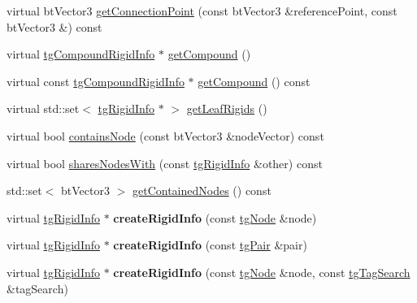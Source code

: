 \begin{DoxyCompactItemize}
\item 
virtual bt\-Vector3 \hyperlink{classtg_compound_rigid_info_a68d3a9c0aba249e83afc987157d92205}{get\-Connection\-Point} (const bt\-Vector3 \&reference\-Point, const bt\-Vector3 \&) const 
\item 
virtual \hyperlink{classtg_compound_rigid_info}{tg\-Compound\-Rigid\-Info} $\ast$ \hyperlink{classtg_compound_rigid_info_aa3efabdcaaa73b20e8f54f0a9078e7c8}{get\-Compound} ()
\item 
virtual const \hyperlink{classtg_compound_rigid_info}{tg\-Compound\-Rigid\-Info} $\ast$ \hyperlink{classtg_compound_rigid_info_a7fd1daa19aaaf18b8bc4a6515ad3fe49}{get\-Compound} () const 
\item 
virtual std\-::set$<$ \hyperlink{classtg_rigid_info}{tg\-Rigid\-Info} $\ast$ $>$ \hyperlink{classtg_compound_rigid_info_a253b7389913caff94baa2a34150d1171}{get\-Leaf\-Rigids} ()
\item 
virtual bool \hyperlink{classtg_compound_rigid_info_a3c82d68ac0347f3a584c2628fdb825cc}{contains\-Node} (const bt\-Vector3 \&node\-Vector) const 
\item 
virtual bool \hyperlink{classtg_compound_rigid_info_a372bf800b5f126b5347acb109b3bba53}{shares\-Nodes\-With} (const \hyperlink{classtg_rigid_info}{tg\-Rigid\-Info} \&other) const 
\item 
std\-::set$<$ bt\-Vector3 $>$ \hyperlink{classtg_compound_rigid_info_ae2cd4e778a173251232f257467a84a17}{get\-Contained\-Nodes} () const 
\item 
\hypertarget{classtg_rigid_info_a5d2a96b8148b75b8bb71640c74e355cb}{virtual \hyperlink{classtg_rigid_info}{tg\-Rigid\-Info} $\ast$ {\bfseries create\-Rigid\-Info} (const \hyperlink{classtg_node}{tg\-Node} \&node)}\label{classtg_rigid_info_a5d2a96b8148b75b8bb71640c74e355cb}

\item 
\hypertarget{classtg_rigid_info_ab49822de5b103feac5e08465618873de}{virtual \hyperlink{classtg_rigid_info}{tg\-Rigid\-Info} $\ast$ {\bfseries create\-Rigid\-Info} (const \hyperlink{classtg_pair}{tg\-Pair} \&pair)}\label{classtg_rigid_info_ab49822de5b103feac5e08465618873de}

\item 
\hypertarget{classtg_rigid_info_a06b02534af62fa7c935accf8321a4c8f}{virtual \hyperlink{classtg_rigid_info}{tg\-Rigid\-Info} $\ast$ {\bfseries create\-Rigid\-Info} (const \hyperlink{classtg_node}{tg\-Node} \&node, const \hyperlink{classtg_tag_search}{tg\-Tag\-Search} \&tag\-Search)}\label{classtg_rigid_info_a06b02534af62fa7c935accf8321a4c8f}


\end{DoxyCompactItemize}
